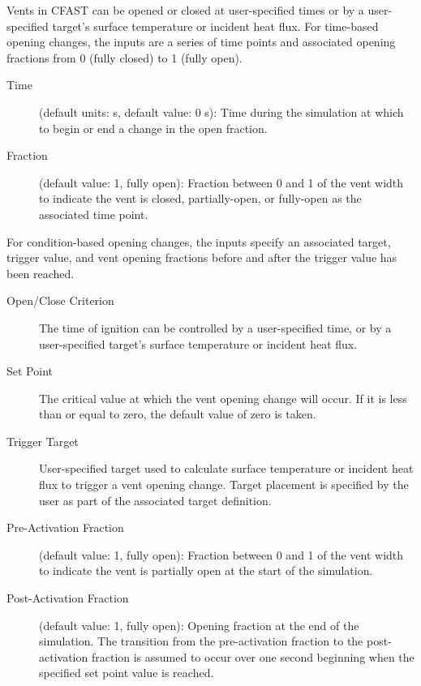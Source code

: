 Vents in CFAST can be opened or closed at user-specified times or by a user-specified target's surface temperature or incident heat flux. For time-based opening changes, the inputs are a series of time points and associated opening fractions from 0 (fully closed) to 1 (fully open).

\begin{description}
\item[Time] (default units: s, default value: 0 s): Time during the simulation at which to begin or end a change in the open fraction.
\item[Fraction] (default value: 1, fully open): Fraction between 0 and 1 of the vent width to indicate the vent is closed, partially-open, or fully-open as the associated time point.
\end{description}

For condition-based opening changes, the inputs specify an associated target, trigger value, and vent opening fractions before and after the trigger value has been reached.

\begin{description}
\item[Open/Close Criterion] The time of ignition can be controlled by a user-specified time, or by a user-specified target's surface temperature or incident heat flux.
\item[Set Point] The critical value at which the vent opening change will occur. If it is less than or equal to zero, the default value of zero is taken.
\item[Trigger Target] User-specified target used to calculate surface temperature or incident heat flux to trigger a vent opening change. Target placement is specified by the user as part of the associated target definition.
\item[Pre-Activation Fraction] (default value: 1, fully open): Fraction between 0 and 1 of the vent width to indicate the vent is partially open at the start of the simulation.
\item[Post-Activation Fraction] (default value: 1, fully open): Opening fraction at the end of the simulation. The transition from the pre-activation fraction to the post-activation fraction is assumed to occur over one second beginning when the specified set point value is reached.
\end{description}

